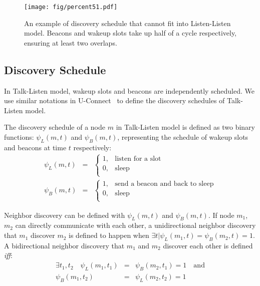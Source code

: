 \documentclass[conference]{IEEEtran}
\begin{document}
\begin{figure}[t]
    \centering
    \texttt{[image: fig/percent51.pdf]}
    \caption{An example of discovery schedule that cannot fit into Listen-Listen model.
             Beacons and wakeup slots take up half of a cycle respectively, ensuring at least two overlaps.}\label{examplellcanntexplain}
\end{figure}

\subsection{Discovery Schedule}
In Talk-Listen model, wakeup slots and beacons are independently scheduled.
We use similar notations in U-Connect~\cite{kandhalu2010u} to define the discovery schedules of Talk-Listen model.

The discovery schedule of a node $m$ in Talk-Listen model is defined as two binary functions:
$\psi_L (m,t)$ and $\psi_B (m,t)$,
representing the schedule of wakeup slots and beacons at time $t$ respectively:
\begin{eqnarray}
    \psi_L (m,t) & = & \left\{ \begin{array}{ll}
            1, & \textrm{listen for a slot} \nonumber \\
            0, & \textrm{sleep}\\
        \end{array} \right.
\\
    \psi_B (m,t) & = &\left\{ \begin{array}{ll}
            1, & \textrm{send a beacon and back to sleep} \nonumber \\
            0, & \textrm{sleep}\\
        \end{array} \right.
\end{eqnarray}

Neighbor discovery can be defined with $\psi_L (m,t)$ and $\psi_B (m,t)$.
If node $m_1$, $m_2$ can directly communicate with each other, 
a unidirectional neighbor discovery that $m_1$ discover $m_2$ is defined to happen when $\exists t | \psi_L(m_1, t)=\psi_B(m_2, t)=1$.
A bidirectional neighbor discovery that $m_1$ and $m_2$ discover each other is defined \emph{iff}:
\begin{eqnarray}\label{bidiscoverydef}
    \exists t_1,t_2 \quad \psi_L(m_1, t_1) & = & \psi_B(m_2, t_1)=1  \quad \textrm{and} \nonumber \\
                      \psi_B(m_1, t_2) & = & \psi_L(m_2, t_2)=1
\end{eqnarray}
\end{document}
